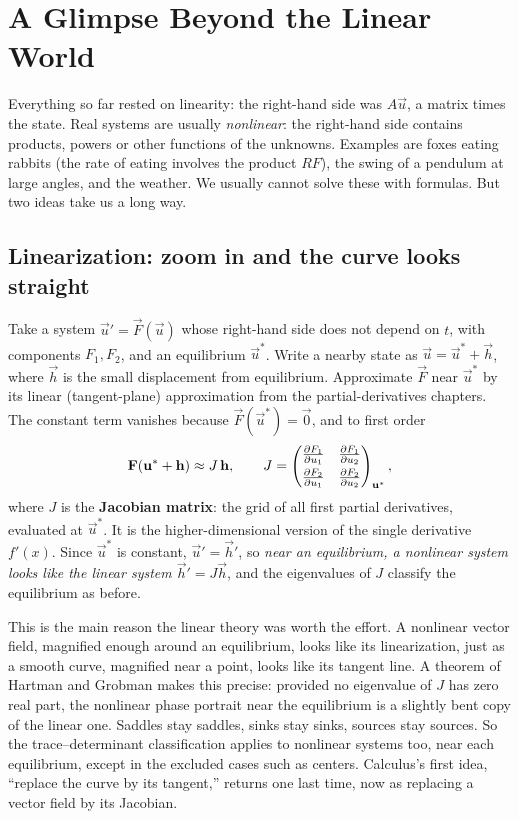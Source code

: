 \section{A Glimpse Beyond the Linear World}
\label{ch39:nonlinear}

Everything so far rested on linearity: the right-hand side was $A\vec u$, a
matrix times the state. Real systems are usually \emph{nonlinear}: the
right-hand side contains products, powers or other functions of the unknowns.
Examples are foxes eating rabbits (the rate of eating involves the product
$RF$), the swing of a pendulum at large angles, and the weather. We usually
cannot solve these with formulas. But two ideas take us a long way.

\subsection{Linearization: zoom in and the curve looks straight}

Take a system $\vec u' = \vec F(\vec u)$ whose right-hand side does not depend
on $t$, with components $F_1, F_2$, and an equilibrium $\vec u^{*}$. Write a
nearby state as $\vec u = \vec u^{*} + \vec h$, where $\vec h$ is the small
displacement from equilibrium. Approximate $\vec F$ near $\vec u^{*}$ by its
linear (tangent-plane) approximation from the partial-derivatives chapters. The constant term
vanishes because $\vec F(\vec u^{*})=\vec 0$, and to first order
\[
  \mathbf{F}(\mathbf{u}^{*} + \mathbf{h}) \approx J\,\mathbf{h},
  \qquad
  J = \begin{pmatrix}
    \frac{\partial F_1}{\partial u_1} & \frac{\partial F_1}{\partial u_2} \\[4pt]
    \frac{\partial F_2}{\partial u_1} & \frac{\partial F_2}{\partial u_2}
  \end{pmatrix}_{\mathbf{u}^{*}},
\]
where $J$ is the \textbf{Jacobian matrix}: the grid of all first partial
derivatives, evaluated at $\vec u^{*}$. It is the
higher-dimensional version of the single derivative $f'(x)$. Since $\vec
u^{*}$ is constant, $\vec u' = \vec h'$, so \emph{near an
equilibrium, a nonlinear system looks like the linear system $\vec h' = J\vec h$},
and the eigenvalues of $J$ classify the equilibrium as before.

\begin{whybox}
This is the main reason the linear theory was worth the effort. A
nonlinear vector field, magnified enough around an
equilibrium, looks like its linearization, just as a smooth
curve, magnified near a point, looks like its tangent line. A theorem of
Hartman and Grobman makes this precise: provided no eigenvalue of $J$ has zero
real part, the nonlinear phase portrait near the equilibrium is a slightly
bent copy of the linear one. Saddles stay saddles, sinks stay sinks, sources stay sources.
So the trace--determinant classification applies to nonlinear systems too, near
each equilibrium, except in the excluded cases such as centers.
Calculus's first idea, ``replace the curve by its tangent,'' returns one last
time, now as replacing a vector field by its Jacobian.
\end{whybox}

